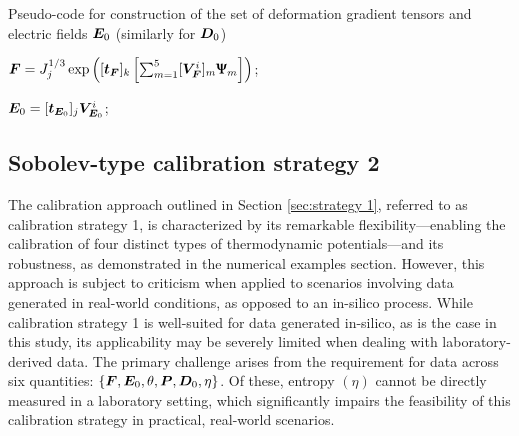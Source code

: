 \begin{algorithm}[htbp!]
	\caption{Pseudo-code for construction of the set of deformation gradient tensors and electric  fields $\boldsymbol{E}_0$ (similarly for $\boldsymbol{D}_0$)}
	\label{alg:F_construction}  
	\begin{algorithmic}[1]                                                     
		
		
		
		\State $\bm{F} = J_j^{1/3} \exp\left([\boldsymbol{t}_{\boldsymbol{F}}]_k \left[\sum_{m = 1}^{5} [\boldsymbol{V}^i_{\boldsymbol{F}}]_m \bm{\Uppsi}_{m}\right] \right)$;	            		
		\EndFor
		\EndFor
		\EndFor
		
\State $\bm{E}_0 = [\boldsymbol{t}_{\boldsymbol{E}_0}]_j\boldsymbol{V}^i_{\boldsymbol{E}_0}$;
\EndFor
\EndFor
		
		
		
	\end{algorithmic}
\end{algorithm}                         



\newpage

\subsection{Sobolev-type calibration strategy 2}\label{sec:strategy 2}

The calibration approach outlined in Section \ref{sec:strategy 1}, referred to as calibration strategy 1, is characterized by its remarkable flexibility—enabling the calibration of four distinct types of thermodynamic potentials—and its robustness, as demonstrated in the numerical examples section. However, this approach is subject to criticism when applied to scenarios involving data generated in real-world conditions, as opposed to an in-silico process. While calibration strategy 1 is well-suited for data generated in-silico, as is the case in this study, its applicability may be severely limited when dealing with laboratory-derived data. The primary challenge arises from the requirement for data across six quantities: $\{\boldsymbol{F},\boldsymbol{E}_0,\theta,\boldsymbol{P},\boldsymbol{D}_0,\eta\}$. Of these, entropy $(\eta)$ cannot be directly measured in a laboratory setting, which significantly impairs the feasibility of this calibration strategy in practical, real-world scenarios.


